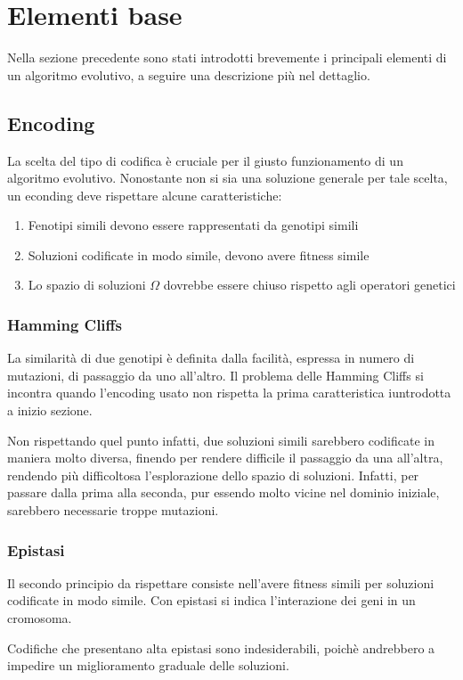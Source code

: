 \documentclass[a4paper]{article}
\begin{document}
\newpage

\section{Elementi base}
Nella sezione precedente sono stati introdotti brevemente i principali elementi 
di un algoritmo evolutivo, a seguire una descrizione più nel dettaglio.

\subsection{Encoding}
La scelta del tipo di codifica è cruciale per il giusto funzionamento
di un algoritmo evolutivo.
Nonostante non si sia una soluzione generale per tale scelta, un econding deve rispettare 
alcune caratteristiche:
\begin{enumerate}
    \item Fenotipi simili devono essere rappresentati da genotipi simili
    \item Soluzioni codificate in modo simile, devono avere fitness simile
    \item Lo spazio di soluzioni $\Omega$ dovrebbe essere chiuso rispetto agli operatori genetici
\end{enumerate}
\subsubsection{Hamming Cliffs}
La similarità di due genotipi è definita dalla facilità, espressa in numero 
di mutazioni, di passaggio da uno all'altro. 
Il problema delle Hamming Cliffs si incontra quando l'encoding usato non rispetta 
la prima caratteristica iuntrodotta a inizio sezione.

Non rispettando quel punto infatti, due soluzioni simili sarebbero codificate in maniera
molto diversa, finendo per rendere difficile il passaggio da una all'altra, rendendo più difficoltosa 
l'esplorazione dello spazio di soluzioni. Infatti, per passare dalla prima alla seconda, 
pur essendo molto vicine nel dominio iniziale, sarebbero necessarie troppe mutazioni.
\subsubsection{Epistasi}
Il secondo principio da rispettare consiste nell'avere fitness simili per soluzioni 
codificate in modo simile.
Con epistasi si indica l'interazione dei geni in un cromosoma.

Codifiche che presentano alta epistasi sono indesiderabili, poichè andrebbero a 
impedire un miglioramento graduale delle soluzioni.
\end{document}
